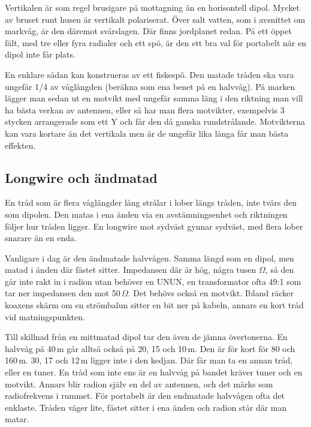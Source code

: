 Vertikalen är som regel brusigare på mottagning än en horisontell
dipol. Mycket av bruset runt husen är vertikalt polariserat. Över
salt vatten, som i avsnittet om markvåg, är den däremot
svårslagen. Där finns jordplanet redan. På ett öppet fält, med tre
eller fyra radialer och ett spö, är den ett bra val för portabelt när
en dipol inte får plats.

En enklare sådan kan konstrueras av ett fiskespö. Den matade tråden
ska vara ungefär 1/4 av våglängden (beräkna som ena benet på en
halvvåg). På marken lägger man sedan ut en motvikt med ungefär samma
läng i den riktning man vill ha bästa verkan av antennen, eller så har
man flera motvikter, exempelvis 3 stycken arrangerade som ett Y och
får den då ganska rundstrålande. Motvikterna kan vara kortare än det
vertikala men är de ungefär lika långa får man bästa effekten.

\subsection{Longwire och ändmatad}

En tråd som är flera våglängder lång strålar i lober längs tråden,
inte tvärs den som dipolen. Den matas i ena änden via en
avstämningsenhet och riktningen följer hur tråden ligger. En longwire
mot sydväst gynnar sydväst, med flera lober snarare än en enda.

Vanligare i dag är den ändmatade halvvågen. Samma längd som en dipol,
men matad i änden där fästet sitter. Impedansen där är hög, några
tusen $\Omega$, så den går inte rakt in i radion utan behöver en UNUN,
en transformator ofta 49:1 som tar ner impedansen den mot
50\,$\Omega$. Det behövs också en motvikt. Ibland räcker koaxens skärm
om en strömbalun sitter en bit ner på kabeln, annars en kort tråd vid
matningspunkten.

Till skillnad från en mittmatad dipol tar den även de jämna
övertonerna. En halvvåg på 40\,m går alltså också på 20, 15 och 10\,m.
Den är för kort för 80 och 160\,m. 30, 17 och 12\,m ligger inte i den
kedjan. Där får man ta en annan tråd, eller en tuner. En tråd som inte
ens är en halvvåg på bandet kräver tuner och en motvikt. Annars blir
radion själv en del av antennen, och det märks som radiofrekvens i
rummet. För portabelt är den endmatade halvvågen ofta det enklaste.
Tråden väger lite, fästet sitter i ena änden och radion står där man
matar.

